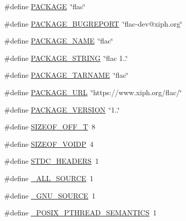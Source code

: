 \begin{DoxyCompactItemize}
\#define \hyperlink{mac_2config_2i386_2lib-src_2libflac_2config_8h_aca8570fb706c81df371b7f9bc454ae03}{P\+A\+C\+K\+A\+GE}~\char`\"{}flac\char`\"{}
\item 
\#define \hyperlink{mac_2config_2i386_2lib-src_2libflac_2config_8h_a1d1d2d7f8d2f95b376954d649ab03233}{P\+A\+C\+K\+A\+G\+E\+\_\+\+B\+U\+G\+R\+E\+P\+O\+RT}~\char`\"{}flac-\/dev@xiph.\+org\char`\"{}
\item 
\#define \hyperlink{mac_2config_2i386_2lib-src_2libflac_2config_8h_a1c0439e4355794c09b64274849eb0279}{P\+A\+C\+K\+A\+G\+E\+\_\+\+N\+A\+ME}~\char`\"{}flac\char`\"{}
\item 
\#define \hyperlink{mac_2config_2i386_2lib-src_2libflac_2config_8h_ac73e6f903c16eca7710f92e36e1c6fbf}{P\+A\+C\+K\+A\+G\+E\+\_\+\+S\+T\+R\+I\+NG}~\char`\"{}flac 1..\char`\"{}
\item 
\#define \hyperlink{mac_2config_2i386_2lib-src_2libflac_2config_8h_af415af6bfede0e8d5453708afe68651c}{P\+A\+C\+K\+A\+G\+E\+\_\+\+T\+A\+R\+N\+A\+ME}~\char`\"{}flac\char`\"{}
\item 
\#define \hyperlink{mac_2config_2i386_2lib-src_2libflac_2config_8h_a5c93853116d5a50307b6744f147840aa}{P\+A\+C\+K\+A\+G\+E\+\_\+\+U\+RL}~\char`\"{}https\+://www.\+xiph.\+org/flac/\char`\"{}
\item 
\#define \hyperlink{mac_2config_2i386_2lib-src_2libflac_2config_8h_aa326a05d5e30f9e9a4bb0b4469d5d0c0}{P\+A\+C\+K\+A\+G\+E\+\_\+\+V\+E\+R\+S\+I\+ON}~\char`\"{}1..\char`\"{}
\item 
\#define \hyperlink{mac_2config_2i386_2lib-src_2libflac_2config_8h_a92a3775c9835089677d63cd605ec1a7a}{S\+I\+Z\+E\+O\+F\+\_\+\+O\+F\+F\+\_\+T}~8
\item 
\#define \hyperlink{mac_2config_2i386_2lib-src_2libflac_2config_8h_a8bcdbb0550d2cf79483efdfb3fe9013f}{S\+I\+Z\+E\+O\+F\+\_\+\+V\+O\+I\+DP}~4
\item 
\#define \hyperlink{mac_2config_2i386_2lib-src_2libflac_2config_8h_a550e5c272cc3cf3814651721167dcd23}{S\+T\+D\+C\+\_\+\+H\+E\+A\+D\+E\+RS}~1
\item 
\#define \hyperlink{mac_2config_2i386_2lib-src_2libflac_2config_8h_a6a4f67fdf3f14cde3b17d2465bf9ebb9}{\+\_\+\+A\+L\+L\+\_\+\+S\+O\+U\+R\+CE}~1
\item 
\#define \hyperlink{mac_2config_2i386_2lib-src_2libflac_2config_8h_a369266c24eacffb87046522897a570d5}{\+\_\+\+G\+N\+U\+\_\+\+S\+O\+U\+R\+CE}~1
\item 
\#define \hyperlink{mac_2config_2i386_2lib-src_2libflac_2config_8h_ad44924736167f82a10ae2891fc98a608}{\+\_\+\+P\+O\+S\+I\+X\+\_\+\+P\+T\+H\+R\+E\+A\+D\+\_\+\+S\+E\+M\+A\+N\+T\+I\+CS}~1

\end{DoxyCompactItemize}
